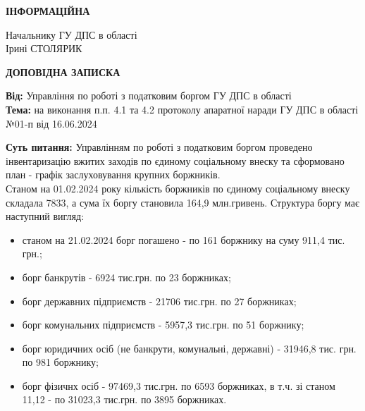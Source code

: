 

	
		
	\vspace{20.8pt}
	
	\begin{flushright}
		\begin{minipage}{0.4\textwidth}
			\textbf{	ІНФОРМАЦІЙНА}
		\end{minipage}
	\end{flushright}
	
	\begin{flushright}
		\begin{minipage}{0.35\textwidth}
			Начальнику ГУ ДПС в області\\
			Ірині СТОЛЯРИК
		\end{minipage}
	\end{flushright}
		\vspace{20.8pt}
	
	\begin{center}
		\textbf{	ДОПОВІДНА ЗАПИСКА}
	\end{center}	
	
	\vspace{20.8pt}
	
	
	\textbf{ Від:} Управління по роботі з податковим боргом ГУ ДПС в області\\
		
				
	\textbf{ Тема:} на виконання п.п. 4.1 та 4.2 протоколу апаратної наради ГУ ДПС в області №01-п від 16.06.2024\\
	
	\vspace{10.8pt}

	
	
	\textbf{ Суть питання:} Управлінням по роботі з податковим боргом проведено інвентаризацію вжитих заходів по єдиному соціальному внеску та сформовано план - графік заслуховування крупних боржників.\\
	

	\setlength{\itemindent}{1.75em} Станом на 01.02.2024 року кількість боржників по єдиному соціальному внеску складала 7833, а сума їх боргу становила 164,9 млн.гривень.
    Структура боргу має наступний вигляд:
    \begin{itemize}
        \item станом на 21.02.2024 борг погашено  - по 161 боржнику на суму 911,4 тис. грн.;
        \item борг банкрутів - 6924 тис.грн. по 23 боржниках;
        \item борг державних підприємств - 21706 тис.грн. по 27 боржниках;
        \item борг комунальних підприємств - 5957,3 тис.грн. по 51 боржнику;
        \item борг юридичних осіб (не банкрути, комунальні, державні) - 31946,8 тис. грн. по 981 боржнику;
        \item борг фізичнх осіб - 97469,3 тис.грн. по 6593 боржниках, в т.ч. зі станом 11,12 - по 31023,3 тис.грн. по  3895 боржниках.
    
    \end{itemize}

